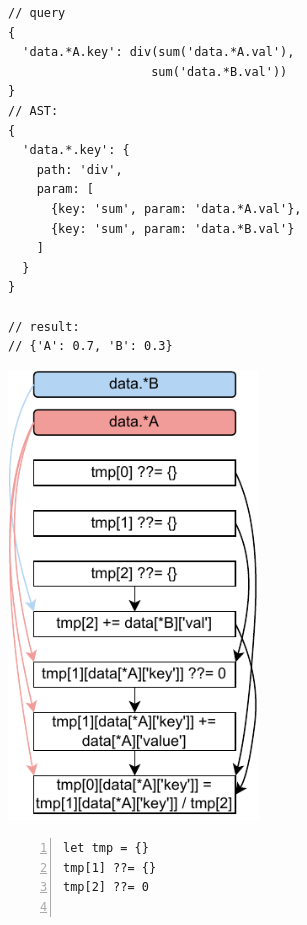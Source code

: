 \documentclass[runningheads]{llncs}
\begin{document}
\begin{figure}[t!]
\begin{subfigure}{\textwidth}
\begin{minipage}{0.33\textwidth}
\begin{lstlisting}[style=JavaScriptTiny, columns=flexible]
// query
{
  'data.*A.key': div(sum('data.*A.val'), 
                    sum('data.*B.val')) 
}
// AST:
{
  'data.*.key': {
    path: 'div',
    param: [
      {key: 'sum', param: 'data.*A.val'},
      {key: 'sum', param: 'data.*B.val'}
    ]
  }
}

// result:
// {'A': 0.7, 'B': 0.3}
\end{lstlisting}
\end{minipage}
\begin{minipage}{0.27\textwidth}
\centering
\includegraphics[width=0.73\textwidth]{images/intro_q3_ir.pdf}
\end{minipage}
\begin{minipage}{0.38\textwidth}
\begin{lstlisting}[style=JavaScriptTiny, columns=flexible, numbers=left, xleftmargin=2pt]
let tmp = {}
tmp[1] ??= {}
tmp[2] ??= 0


\end{lstlisting}
\end{minipage}
\end{subfigure}
\end{figure}
\end{document}
